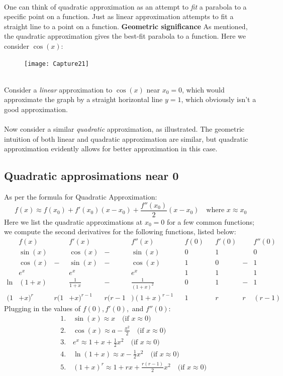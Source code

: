 \documentclass{report}
\begin{document}
\vspace{1mm}\\
One can think of quadratic approximation as an attempt
to \textit{fit} a parabola to a specific point on a function. Just as linear approximation
attempts to fit a straight line to a point on a function.
\newpage
\noindent\textbf{Geometric significance}
As mentioned, the quadratic approximation gives the best-fit parabola to a function. 
Here we consider $\cos(x)$:
\begin{figure}[h]
\texttt{[image: Capture21]}\\
\centering
{} 
\end{figure}\\
Consider a \textit{linear} approximation to $\cos(x)$ near $x_0=0$, which would 
approximate the graph by a straight horizontal line $y=1$, which obviously isn't a good approximation.\\
\vspace{1mm}\\
Now consider a similar \textit{quadratic} approximation, as illustrated. The 
geometric intuition of both linear and quadratic approximation are similar,
but quadratic approximation evidently allows for better approximation in this case.
\newpage

\subsection{Quadratic approsimations near 0} %
As per the formula for Quadratic Approximation:
\begin{equation*}
f(x)\approx f(x_0)+f'(x_0)(x-x_0)+\frac{f''(x_0)}{2}(x-x_0)\quad\text{where $x\approx x_0$}
\end{equation*}
Here we list the quadratic approximations at $x_0=0$ for a few common functions; 
we compute the second derivatives for the following functions, listed below:
\begin{align*}
&f(x)&&f'(x)&&f''(x)&&f(0)&&f'(0)&&f''(0)\\
&\sin(x)&&\cos(x)&-&\sin(x)&&0&&1&&0\\
&\cos(x)&-&\sin(x)&-&\cos(x)&&1&&0&-&1\\
&e^x&&e^x&&e^x&&1&&1&&1\\
\ln&(1+x)&&\frac{1}{1+x}&-&\frac{1}{(1+x)^2}&&0&&1&-&1\\
(1&+x)^r&r(1&+x)^{r-1}&r(r-1&)(1+x)^{r-1}&&1&&r&r&(r-1)
\end{align*}
Plugging in the values of $f(0),f'(0),$ and $f''(0)$:
\begin{align*}
&1.\quad\sin(x)\approx x\quad\text{(if $x\approx0$)}\\
&2.\quad\cos(x)\approx a-\frac{x^2}{2}\quad\text{(if $x\approx0$)}\\
&3.\quad e^x\approx 1+x+\frac{1}{2}x^2\quad\text{(if $x\approx0$)}\\
&4.\quad\ln(1+x)\approx x-\frac{1}{2}x^2\quad\text{(if $x\approx0$)}\\
&5.\quad(1+x)^r\approx1+rx+\frac{r(r-1)}{2}x^2\quad\text{(if $x\approx0$)}
\end{align*}
\newpage
\end{document}
